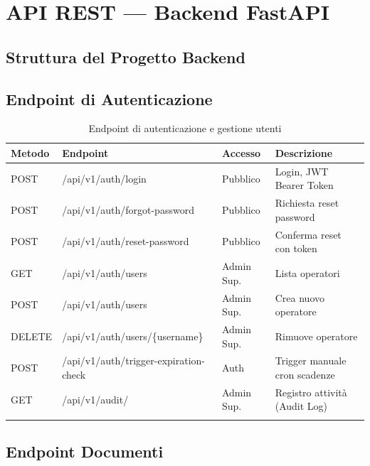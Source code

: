\documentclass[12pt,a4paper,oneside]{report}
\begin{document}
\chapter{API REST --- Backend FastAPI}

\section{Struttura del Progetto Backend}

\section{Endpoint di Autenticazione}

\begin{longtable}{>{\ttfamily\small}p{1.5cm} >{\ttfamily\small}p{7.5cm} p{2cm} p{3cm}}
    \toprule
    \normalfont\textbf{Metodo} & \normalfont\textbf{Endpoint} &
    \normalfont\textbf{Accesso} & \normalfont\textbf{Descrizione} \\
    \midrule
    \endhead
    POST & /api/v1/auth/login & Pubblico & Login, JWT Bearer Token \\
    POST & /api/v1/auth/forgot-password & Pubblico & Richiesta reset password \\
    POST & /api/v1/auth/reset-password & Pubblico & Conferma reset con token \\
    GET  & /api/v1/auth/users & Admin Sup. & Lista operatori \\
    POST & /api/v1/auth/users & Admin Sup. & Crea nuovo operatore \\
    DELETE & /api/v1/auth/users/\{username\} & Admin Sup. & Rimuove operatore \\
    POST & /api/v1/auth/trigger-expiration-check & Auth & Trigger manuale cron scadenze \\
    GET  & /api/v1/audit/ & Admin Sup. & Registro attivit\`{a} (Audit Log) \\
    \bottomrule
    \caption{Endpoint di autenticazione e gestione utenti}
\end{longtable}

\section{Endpoint Documenti}
\end{document}
